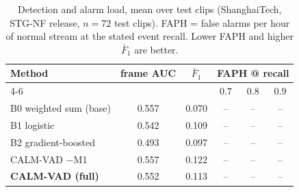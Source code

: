 \begin{table}[t]
\centering
\caption{Detection and alarm load, mean over test clips (ShanghaiTech, STG-NF
release, $n{=}72$ test clips). FAPH = false alarms per hour of normal stream
at the stated event recall. Lower FAPH and higher $\bar F_1$ are better.}
\label{tab:main}
\setlength{\tabcolsep}{4pt}
\renewcommand{\arraystretch}{1.15}
\footnotesize
\begin{tabular}{@{}lccccc@{}}
\toprule
Method & frame AUC & $\bar F_1$ & \multicolumn{3}{c}{FAPH @ recall} \\
\cmidrule(l){4-6}
 & & & $0.7$ & $0.8$ & $0.9$ \\
\midrule
B0 weighted sum (base)      & 0.557 & 0.070 & -- & -- & -- \\
B1 logistic                 & 0.542 & 0.109 & -- & -- & -- \\
B2 gradient-boosted         & 0.493 & 0.097 & -- & -- & -- \\
\midrule
CALM-VAD $-$M1              & 0.557 & 0.122 & -- & -- & -- \\
\textbf{CALM-VAD (full)}   & 0.552 & 0.113 & -- & -- & -- \\
\bottomrule
\end{tabular}
\end{table}
